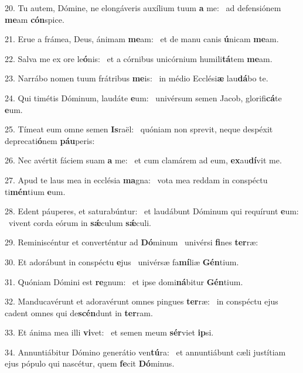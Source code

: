20. Tu autem, Dómine, ne elongáveris auxílium tuum \textbf{a} me: \ast\  ad defensiónem \textbf{me}am \textbf{cón}spice.\

21. Erue a frámea, Deus, ánimam \textbf{me}am: \ast\  et de manu canis \textbf{ú}nicam \textbf{me}am.\

22. Salva me ex ore le\textbf{ó}nis: \ast\  et a córnibus unicórnium humili\textbf{tá}tem \textbf{me}am.\

23. Narrábo nomen tuum frátribus \textbf{me}is: \ast\  in médio Ecclési\textbf{æ} lau\textbf{dá}bo te.\

24. Qui timétis Dóminum, laudáte \textbf{e}um: \ast\  univérsum semen Jacob, glorifi\textbf{cá}te \textbf{e}um.\

25. Tímeat eum omne semen \textbf{Is}raël: \ast\  quóniam non sprevit, neque despéxit deprecati\textbf{ó}nem \textbf{páu}peris:\

26. Nec avértit fáciem suam \textbf{a} me: \ast\  et cum clamárem ad eum, \textbf{ex}au\textbf{dí}vit me.\

27. Apud te laus mea in ecclésia \textbf{ma}gna: \ast\  vota mea reddam in conspéctu ti\textbf{mén}tium \textbf{e}um.\

28. Edent páuperes, et saturabúntur: \dag\  et laudábunt Dóminum qui requírunt \textbf{e}um: \ast\  vivent corda eórum in \textbf{sǽ}culum \textbf{sǽ}culi.\

29. Reminiscéntur et converténtur ad \textbf{Dó}minum \ast\  univérsi \textbf{fi}nes \textbf{ter}ræ:\

30. Et adorábunt in conspéctu \textbf{e}jus \ast\  univérsæ fa\textbf{mí}liæ \textbf{Gén}tium.\

31. Quóniam Dómini est \textbf{re}gnum: \ast\  et ipse domi\textbf{ná}bitur \textbf{Gén}tium.\

32. Manducavérunt et adoravérunt omnes pingues \textbf{ter}ræ: \ast\  in conspéctu ejus cadent omnes qui de\textbf{scén}dunt in \textbf{ter}ram.\

33. Et ánima mea illi \textbf{vi}vet: \ast\  et semen meum \textbf{sér}viet \textbf{ip}si.\

34. Annuntiábitur Dómino generátio ven\textbf{tú}ra: \ast\  et annuntiábunt cæli justítiam ejus pópulo qui nascétur, quem \textbf{fe}cit \textbf{Dó}minus.\

